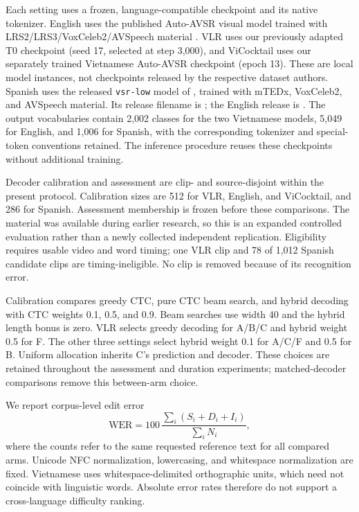 Each setting uses a frozen, language-compatible checkpoint and its native
tokenizer. English uses the published Auto-AVSR visual model trained with
LRS2/LRS3/VoxCeleb2/AVSpeech material \citep{ma2023autoavsr}.
VLR uses our previously adapted T0 checkpoint (seed 17, selected at step 3,000),
and ViCocktail uses our separately trained Vietnamese Auto-AVSR checkpoint
(epoch 13). These are local model instances, not checkpoints released by
the respective dataset authors.
Spanish uses the released \texttt{vsr-low} model of \citet{yeo2024vsrlow},
trained with mTEDx, VoxCeleb2, and AVSpeech material. Its release filename is
; the English release is
.
The output vocabularies contain 2,002 classes for the two Vietnamese models,
5,049 for English, and 1,006 for Spanish, with the corresponding tokenizer
and special-token conventions retained.
The inference procedure reuses these checkpoints without additional training.

Decoder calibration and assessment are clip- and source-disjoint within the
present protocol. Calibration sizes are 512 for VLR, English, and ViCocktail,
and 286 for Spanish. Assessment membership is frozen before these comparisons.
The material was available during earlier research, so this is an expanded
controlled evaluation rather than a newly collected independent replication.
Eligibility requires usable video and word timing; one VLR clip and 78 of
1,012 Spanish candidate clips are timing-ineligible. No clip is removed because
of its recognition error.

Calibration compares greedy CTC, pure CTC beam search, and hybrid decoding
with CTC weights 0.1, 0.5, and 0.9. Beam searches use width 40 and the
hybrid length bonus is zero. VLR selects greedy decoding for A/B/C and
hybrid weight 0.5 for F. The other three settings select hybrid weight 0.1
for A/C/F and 0.5 for B. Uniform allocation inherits C's prediction and
decoder. These choices are retained throughout the assessment and duration
experiments; matched-decoder comparisons remove this between-arm choice.

We report corpus-level edit error
\begin{equation}
 \mathrm{WER}=100\,\frac{\sum_i(S_i+D_i+I_i)}{\sum_i N_i},
\end{equation}
where the counts refer to the same requested reference text for all compared
arms. Unicode NFC normalization, lowercasing, and whitespace normalization are
fixed. Vietnamese uses whitespace-delimited orthographic units, which need not
coincide with linguistic words. Absolute error rates therefore do not support
a cross-language difficulty ranking.

